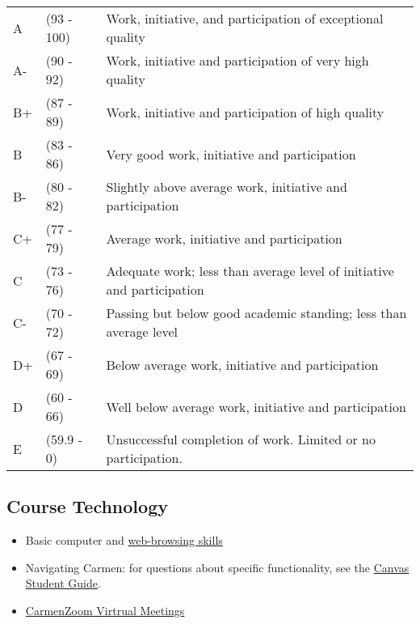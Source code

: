 \begin{tabularx}{\textwidth}{@{}l @{}l X@{}}
      A \hspace*{1em} & (93 - 100) & Work, initiative, and participation of exceptional quality             \\
      A-              & (90 - 92)  & Work, initiative and participation of very high quality                \\
      B+              & (87 - 89)  & Work, initiative and participation of high quality                     \\
      B               & (83 - 86)  & Very good work, initiative and participation                           \\
      B-              & (80 - 82)  & Slightly above average work, initiative and participation              \\
      C+              & (77 - 79)  & Average work, initiative and participation                             \\
      C               & (73 - 76)  & Adequate work; less than average level of initiative and participation \\
      C-              & (70 - 72)  & Passing but below good academic standing; less than average level      \\
      D+              & (67 - 69)  & Below average work, initiative and participation                       \\
      D               & (60 - 66)  & Well below average work, initiative and participation                  \\
      E               & (59.9 - 0) & Unsuccessful completion of work. Limited or no participation.
\end{tabularx}


\subsection{Course Technology}

\begin{itemize}
      \tightlist
      \item Basic computer and \href{https://lmgtfy.com/}{web-browsing skills}
      \item Navigating Carmen: for questions about specific functionality, see the \href{https://community.canvaslms.com/docs/DOC-10701}{Canvas Student Guide}.
      \item \href{https://go.osu.edu/Bqdx}{CarmenZoom Virtrual Meetings}
\end{itemize}

